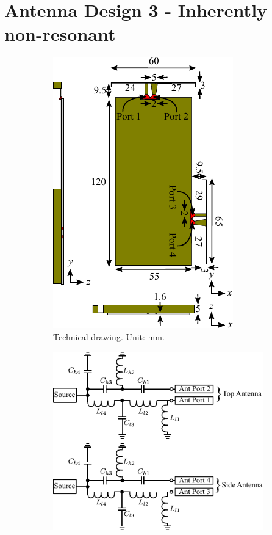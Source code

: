 \section{Antenna Design 3 - Inherently non-resonant}
\label{sec:tech_sol_ant3}
\begin{figure}[htbp]
    \begin{subfigure}[b]{0.49\linewidth}
        \centering
        \includegraphics{img/tech_sol/nonresonant/technical}
        \caption{Technical drawing. Unit: mm.}
        \label{fig:ant3technical}
    \end{subfigure}
    \hfill
    \begin{subfigure}[b]{0.49\linewidth}
        \centering
        \includegraphics{img/tech_sol/nonresonant/schematic_tuning}\\[0cm]

\end{subfigure}
\end{figure}
